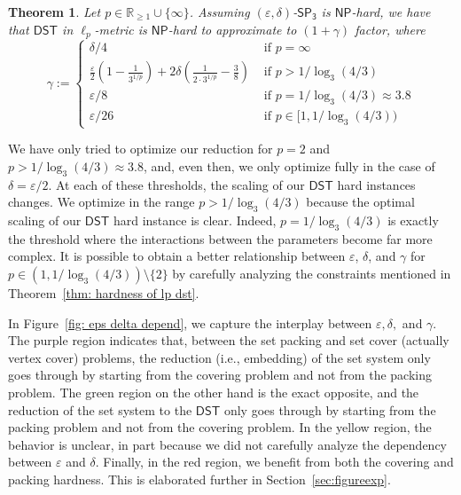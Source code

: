 \documentclass{article}\providecommand{\DeclareRedundantLanguages}[2]{}\usepackage[a4paper,margin=20mm]{geometry}
\newtheorem{theorem}{Theorem}\newtheorem{lemma}[theorem]{Lemma}\newtheorem{proposition}[theorem]{Proposition}\newtheorem{corollary}[theorem]{Corollary}\newtheorem{definition}[theorem]{Definition}\newtheorem{claim}[theorem]{Claim}\newtheorem{remark}[theorem]{Remark}\newtheorem{observation}[theorem]{Observation}\newtheorem{conjecture}[theorem]{Conjecture}\newtheorem{example}[theorem]{Example}
\newcommand{\1}{\textbf{1}}
\newcommand{\setpT}{$\mathsf{SP_3}$\xspace}
\newcommand{\dst}{$\mathsf{DST}$\xspace}
\newcommand{\np}{$\mathsf{NP}$\xspace}
\begin{document}
\begin{theorem}\label{thm:intromain}
    Let $p\in \mathbb{R}_{\geq 1}\cup\{\infty\}$. Assuming $(\varepsilon,\delta)$-\setpT is \np-hard, we have that \dst in $\ell_p$-metric is \np-hard to approximate to $(1+\gamma)$ factor, where
    $$\gamma:=\begin{cases}
        \delta/4&\text{ if } p=\infty \\
        \frac{\varepsilon}{2}\left(1-\frac{1}{3^{1/p}}\right)+2\delta\left(\frac{1}{2\cdot 3^{1/p}}-\frac{3}{8}\right)&\text{ if }p>1/\log_3 (4/3) \\
        \varepsilon/8&\text{ if } p=1/\log_3 (4/3) \approx 3.8\\ 
 \varepsilon/26 &\text{ if } p  \in [1,  1/\log_3(4/3))
     \end{cases}$$
\end{theorem}


We have only tried to optimize our reduction for $p=2$ and $p>1/\log_3(4/3)\approx 3.8$, and, even then, we only optimize fully in the case of $\delta = \varepsilon/2$. At each of these thresholds, the scaling of our \dst hard instances changes. We optimize in the range $p>1/\log_3(4/3)$ because the optimal scaling of our \dst hard instance is clear. Indeed, $p = 1/\log_3(4/3)$ is exactly the threshold where the interactions between the parameters become far more complex. It is possible to obtain a better relationship between $\varepsilon$, $\delta$, and $\gamma$ for $p\in (1,1/\log_3(4/3))\setminus \{2\}$ by carefully analyzing the constraints mentioned in Theorem~\ref{thm: hardness of lp dst}. 

In Figure~\ref{fig: eps delta depend}, we capture the interplay between $\varepsilon,\delta,$ and $\gamma$. The purple region indicates that, between the set packing and set cover (actually vertex cover) problems, the reduction (i.e., embedding) of the set system only goes through by starting from the covering problem and not from the packing problem. The green region on the other hand is the exact opposite, and the reduction  of the set system to the \dst only goes through by starting from the packing problem and not from the covering problem. In the yellow region, the behavior is unclear, in part because we did not carefully analyze the dependency between $\varepsilon$ and $\delta$. Finally, in the red region, we benefit from both the covering and packing hardness. This is elaborated further in Section~\ref{sec:figureexp}. 
\end{document}
